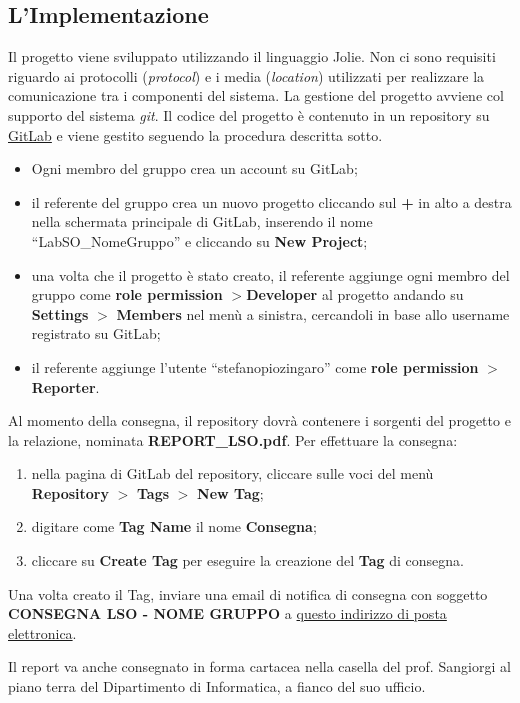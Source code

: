 \subsection{L'Implementazione}
Il progetto viene sviluppato utilizzando il linguaggio Jolie. Non ci sono requisiti riguardo ai protocolli (\textit{protocol}) e i media (\textit{location}) utilizzati per realizzare la comunicazione tra i componenti del sistema. La gestione del progetto avviene col supporto del sistema \textit{git}. Il codice del progetto è contenuto in un repository su \href{http://gitlab.com}{GitLab} e viene gestito seguendo la procedura descritta sotto.
%
\begin{tcolorbox}[colback=blue!20!white,colframe=blue!75!black,title=GitLab]
\begin{itemize}
    \item Ogni membro del gruppo crea un account su GitLab;
    \item il referente del gruppo  crea un nuovo progetto cliccando sul \textbf{+} in alto a destra nella schermata principale di GitLab, inserendo il nome ``LabSO\_NomeGruppo'' e cliccando su \textbf{New Project};
    \item una volta che il progetto è stato creato, il referente aggiunge ogni membro del gruppo come \textbf{role permission} $>$\textbf{Developer} al progetto andando su \textbf{Settings} $>$ \textbf{Members} nel menù a sinistra, cercandoli in base allo username registrato su GitLab;
    \item il referente aggiunge l'utente ``stefanopiozingaro'' come \textbf{role permission} $>$ \textbf{Reporter}.
\end{itemize}
\end{tcolorbox}
%
Al momento della consegna, il repository dovrà contenere i sorgenti del progetto e la relazione, nominata \textbf{REPORT\_LSO.pdf}. Per effettuare la consegna:
\begin{enumerate}
    \item nella pagina di GitLab del repository, cliccare sulle voci del menù \textbf{Repository} $>$ \textbf{Tags} $>$ \textbf{New Tag}; 
    \item digitare come \textbf{Tag Name} il nome \textbf{Consegna};
    \item cliccare su \textbf{Create Tag} per eseguire la creazione del \textbf{Tag} di consegna.
\end{enumerate}
%
Una volta creato il Tag, inviare una email di notifica di consegna con soggetto \textbf{CONSEGNA LSO - NOME GRUPPO} a \href{stefanopio.zingaro@unibo.it}{questo indirizzo di posta elettronica}. 
\begin{tcolorbox}[colback=yellow!20!white,colframe=yellow!75!black,title=\textbf{N.B.}]
    Il report va anche consegnato in forma cartacea nella casella del prof. Sangiorgi al piano terra del Dipartimento di Informatica, a fianco del suo ufficio.
\end{tcolorbox}

